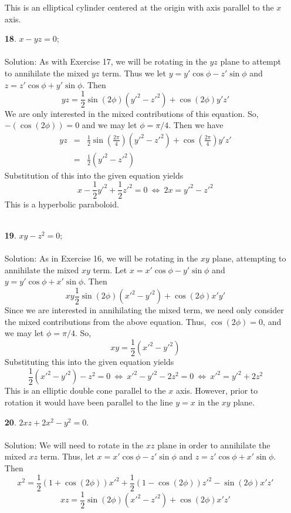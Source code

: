 \documentclass[12pt]{amsbook}
\begin{document}
\begin{enumerate}
This is an elliptical cylinder centered at the origin with axis parallel to the $x$ axis.
\\
\item[{\small\bf 18}.]\quad  $x-yz=0$;
\\
\\
{\sc Solution}: As with Exercise 17, we will be rotating in the $yz$ plane to attempt to annihilate the mixed $yz$ term. Thus we let $y=y'\cos\phi-z'\sin\phi$ and $z=z'\cos\phi+y'\sin\phi$. Then
$$yz=\frac{1}{2}\sin(2\phi)(y'^2-z'^2)+\cos(2\phi)y'z'$$
We are only interested in the mixed contributions of this equation. So, $-(\cos(2\phi))=0$ and we may let $\phi=\pi/4$. Then we have
\begin{eqnarray*}
yz&=&\frac{1}{2}\sin(\frac{2\pi}{4})(y'^2-z'^2)+\cos(\frac{2\pi}{4})y'z'\\
&=&\frac{1}{2}(y'^2-z'^2)
\end{eqnarray*}
Substitution of this into the given equation yields
$$x-\frac{1}{2}y'^2+\frac{1}{2}z'^2=0 \ \Leftrightarrow \ 2x=y'^2-z'^2$$
This is a hyperbolic paraboloid.
\\
\\
\item[{\small\bf 19}.]\quad  $xy-z^2=0$;
\\
\\
{\sc Solution}:
As in Exercise 16, we will be rotating in the $xy$ plane, attempting to annihilate the mixed $xy$ term. Let $x=x'\cos\phi-y'\sin\phi$ and $y=y'\cos\phi+x'\sin\phi$. Then
$$xy\frac{1}{2}\sin(2\phi)(x'^2-y'^2)+\cos(2\phi)x'y'
$$
Since we are interested in annihilating the mixed term, we need only consider the mixed contributions from the above equation. Thus,
$\cos(2\phi)=0$, and we may let $\phi=\pi/4$. So,
$$xy=\frac{1}{2}(x'^2-y'^2)$$
Substituting this into the given equation yields
$$\frac{1}{2}(x'^2-y'^2)-z^2=0 \ \Leftrightarrow \  x'^2-y'^2-2z^2=0 \ \Leftrightarrow \ x'^2=y'^2+2z^2$$
This is an elliptic double cone parallel to the $x$ axis. However, prior to rotation it would have been parallel to the line $y=x$ in the $xy$ plane.
\\
\item[{\small\bf 20}.]\quad  $2xz+2x^2-y^2=0$.
\\
\\
{\sc Solution}: We will need to rotate in the $xz$ plane in order to annihilate the mixed $xz$ term. Thus, let $x=x'\cos\phi-z'\sin\phi$ and $z=z'\cos\phi+x'\sin\phi$. Then
$$x^2=\frac{1}{2}(1+\cos(2\phi))x'^2+\frac{1}{2}(1-\cos(2\phi))z'^2-\sin(2\phi)x'z'$$
$$xz=\frac{1}{2}\sin(2\phi)(x'^2-z'^2)+\cos(2\phi)x'z'
$$
\end{enumerate}
\end{document}
